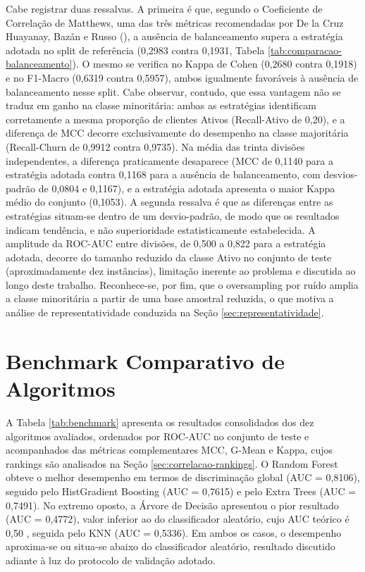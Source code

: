 Cabe registrar duas ressalvas. A primeira é que, segundo o Coeficiente de Correlação de Matthews, uma das três métricas recomendadas por De la Cruz Huayanay, Bazán e Russo (\citeyear{delacruz2025}), a ausência de balanceamento supera a estratégia adotada no split de referência (0,2983 contra 0,1931, Tabela \ref{tab:comparacao-balanceamento}). O mesmo se verifica no Kappa de Cohen (0,2680 contra 0,1918) e no F1-Macro (0,6319 contra 0,5957), ambos igualmente favoráveis à ausência de balanceamento nesse split. Cabe observar, contudo, que essa vantagem não se traduz em ganho na classe minoritária: ambas as estratégias identificam corretamente a mesma proporção de clientes Ativos (Recall-Ativo de 0,20), e a diferença de MCC decorre exclusivamente do desempenho na classe majoritária (Recall-Churn de 0,9912 contra 0,9735). Na média das trinta divisões independentes, a diferença praticamente desaparece (MCC de 0,1140 para a estratégia adotada contra 0,1168 para a ausência de balanceamento, com desvios-padrão de 0,0804 e 0,1167), e a estratégia adotada apresenta o maior Kappa médio do conjunto (0,1053). A segunda ressalva é que as diferenças entre as estratégias situam-se dentro de um desvio-padrão, de modo que os resultados indicam tendência, e não superioridade estatisticamente estabelecida. A amplitude da ROC-AUC entre divisões, de 0,500 a 0,822 para a estratégia adotada, decorre do tamanho reduzido da classe Ativo no conjunto de teste (aproximadamente dez instâncias), limitação inerente ao problema e discutida ao longo deste trabalho. Reconhece-se, por fim, que o oversampling por ruído amplia a classe minoritária a partir de uma base amostral reduzida, o que motiva a análise de representatividade conduzida na Seção \ref{sec:representatividade}.

\FloatBarrier
\section{Benchmark Comparativo de Algoritmos} \label{sec:benchmark}

A Tabela \ref{tab:benchmark} apresenta os resultados consolidados dos dez algoritmos avaliados, ordenados por ROC-AUC no conjunto de teste e acompanhados das métricas complementares MCC, G-Mean e Kappa, cujos rankings são analisados na Seção \ref{sec:correlacao-rankings}. O Random Forest obteve o melhor desempenho em termos de discriminação global (AUC = 0,8106), seguido pelo HistGradient Boosting (AUC = 0,7615) e pelo Extra Trees (AUC = 0,7491). No extremo oposto, a Árvore de Decisão apresentou o pior resultado (AUC = 0,4772), valor inferior ao do classificador aleatório, cujo AUC teórico é 0,50 \cite{fawcett2006}, seguida pelo KNN (AUC = 0,5336). Em ambos os casos, o desempenho aproxima-se ou situa-se abaixo do classificador aleatório, resultado discutido adiante à luz do protocolo de validação adotado.

